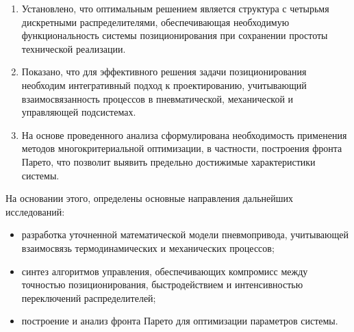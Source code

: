 \begin{enumerate}
	\item Установлено, что оптимальным решением является структура с
	      четырьмя дискретными распределителями, обеспечивающая необходимую
	      функциональность системы позиционирования при сохранении простоты
	      технической реализации.

	\item Показано, что для эффективного решения задачи позиционирования
	      необходим интегративный подход к проектированию, учитывающий
	      взаимосвязанность процессов в пневматической, механической и
	      управляющей подсистемах.

	\item На основе проведенного анализа сформулирована необходимость
	      применения методов многокритериальной оптимизации, в частности,
	      построения фронта Парето, что позволит выявить предельно достижимые
	      характеристики системы.
\end{enumerate}

На основании этого, определены основные направления дальнейших исследований:
\begin{itemize}
	\item разработка уточненной математической модели пневмопривода,
	      учитывающей взаимосвязь термодинамических и механических процессов;
	\item синтез алгоритмов управления, обеспечивающих компромисс между
	      точностью позиционирования, быстродействием и интенсивностью переключений распределителей;
	\item построение и анализ фронта Парето для оптимизации параметров системы.
\end{itemize}
